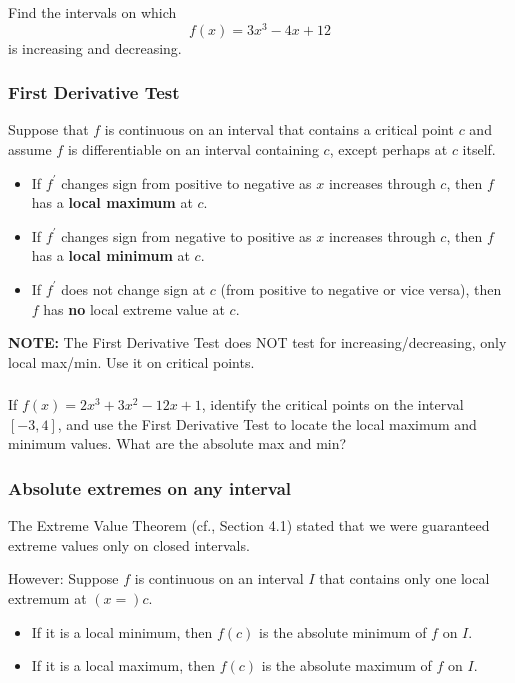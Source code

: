 \documentclass[14pt]{beamer}
\begin{document}
\begin{frame}%
\frametitle{}
\begin{ex} Find the intervals on which
$$f(x)=3x^3-4x+12$$
is increasing and decreasing.
\end{ex}
\end{frame}

\begin{frame}
\frametitle{First Derivative Test}
\footnotesize
Suppose that $f$ is continuous on an interval that contains a critical point $c$ and assume $f$ is differentiable on an interval containing $c$, except perhaps at $c$ itself.

\begin{itemize}
\item If $f^{\prime}$ \alert{changes sign} from positive to negative as $x$ increases through $c$, then $f$ has a {\bf local maximum} at $c$.

\vspace{0.5pc}
\item If $f^{\prime}$ \alert{changes sign} from negative to positive as $x$ increases through $c$, then $f$ has a {\bf local minimum} at $c$.

\vspace{0.5pc}
\item If $f^{\prime}$ does not change sign at $c$ (from positive to negative or vice versa), then $f$ has {\bf no} local extreme value at $c$.
\end{itemize}

\alert{{\bf NOTE:} The First Derivative Test does NOT test for increasing/decreasing, only local max/min.}  Use it on critical points. 
\end{frame}

\begin{frame}%
\frametitle{}
\begin{exe} If $f(x)=2x^3+3x^2-12x+1$, identify the critical points on the interval $[-3,4]$, and use the First Derivative Test to locate the local maximum and minimum values.  What are the absolute max and min? \end{exe}
\end{frame}

\begin{frame}
\frametitle{\small Absolute extremes on any interval}
\small
The Extreme Value Theorem (cf., Section 4.1) stated that we were guaranteed extreme values \alert{only on closed intervals}.  

\vspace{0.5pc}
\alert{However:}  Suppose $f$ is continuous on an interval $I$ that contains only one local extremum at $(x=)c$.

\begin{itemize}
\item If it is a local minimum, then $f(c)$ \alert{is} the absolute minimum of $f$ on $I$.

\vspace{0.5pc}
\item If it is a local maximum, then $f(c)$ \alert{is} the absolute maximum of $f$ on $I$.
\end{itemize}
\end{frame}
\end{document}
